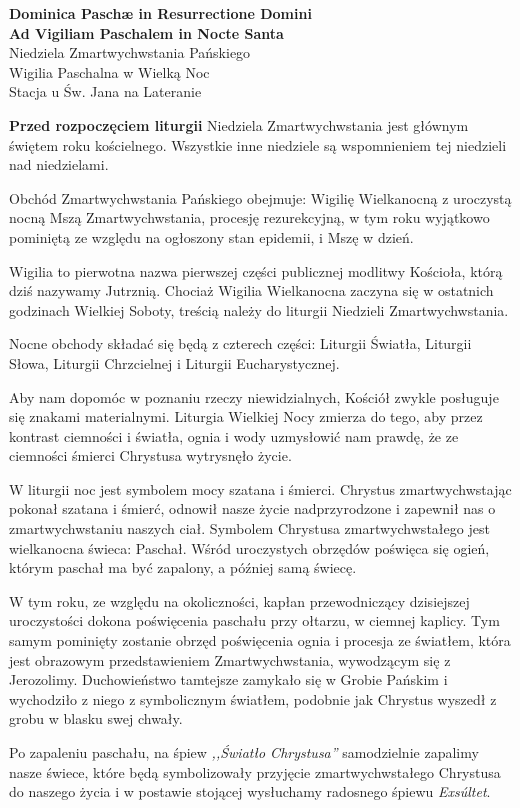 \documentclass[10pt,oneside,final,notitlepage,a4paper,wide]{mwart}
\begin{document}
%
\begin{center}
	\LARGE{\textbf{Dominica Paschæ in Resurrectione Domini\\Ad Vigiliam Paschalem in Nocte Santa}}\\ \smallskip
	\small{Niedziela Zmartwychwstania Pańskiego\\Wigilia Paschalna w Wielką Noc\\ \smallskip Stacja u Św. Jana na Lateranie}
\end{center} \vspace{1cm}

	\textbf{Przed rozpoczęciem liturgii} Niedziela Zmartwychwstania jest głównym świętem roku kościelnego. Wszystkie inne niedziele są wspomnieniem tej niedzieli nad niedzielami.
\par Obchód Zmartwychwstania Pańskiego obejmuje: Wigilię Wielkanocną z uroczystą nocną Mszą Zmartwychwstania, procesję rezurekcyjną, w tym roku wyjątkowo pominiętą ze względu na ogłoszony stan epidemii, i Mszę w dzień.
\par Wigilia to pierwotna nazwa pierwszej części publicznej modlitwy Kościoła, którą dziś nazywamy Jutrznią. Chociaż Wigilia Wielkanocna zaczyna się w ostatnich godzinach Wielkiej Soboty, treścią należy do liturgii Niedzieli Zmartwychwstania.
\par Nocne obchody składać się będą z czterech części: Liturgii Światła, Liturgii Słowa, Liturgii Chrzcielnej i Liturgii Eucharystycznej.
\par Aby nam dopomóc w poznaniu rzeczy niewidzialnych, Kościół zwykle posługuje się znakami materialnymi. Liturgia Wielkiej Nocy zmierza do tego, aby przez kontrast ciemności i światła, ognia i wody uzmysłowić nam prawdę, że ze ciemności śmierci Chrystusa wytrysnęło życie.
\par W liturgii noc jest symbolem mocy szatana i śmierci. Chrystus zmartwychwstając pokonał szatana i śmierć, odnowił nasze życie nadprzyrodzone i zapewnił nas o zmartwychwstaniu naszych ciał. Symbolem Chrystusa zmartwychwstałego jest wielkanocna świeca: Paschał. Wśród uroczystych obrzędów poświęca się ogień, którym paschał ma być zapalony, a później samą świecę.
\par W tym roku, ze względu na okoliczności, kapłan przewodniczący dzisiejszej uroczystości dokona poświęcenia paschału przy ołtarzu, w ciemnej kaplicy. Tym samym pominięty zostanie obrzęd poświęcenia ognia i procesja ze światłem, która jest obrazowym przedstawieniem Zmartwychwstania, wywodzącym się z Jerozolimy. Duchowieństwo tamtejsze zamykało się w Grobie Pańskim i wychodziło z niego z symbolicznym światłem, podobnie jak Chrystus wyszedł z grobu w blasku swej chwały.
\par Po zapaleniu paschału, na śpiew \emph{,,Światło Chrystusa''} samodzielnie zapalimy nasze świece, które będą symbolizowały przyjęcie zmartwychwstałego Chrystusa do naszego życia i w postawie stojącej wysłuchamy radosnego śpiewu \emph{Exsúltet}. \bigskip
\end{document}
